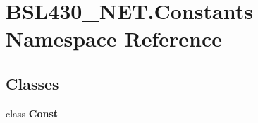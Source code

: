 \hypertarget{namespace_b_s_l430___n_e_t_1_1_constants}{}\section{B\+S\+L430\+\_\+\+N\+E\+T.\+Constants Namespace Reference}
\label{namespace_b_s_l430___n_e_t_1_1_constants}
\subsection*{Classes}
\begin{DoxyCompactItemize}
\item 
class {\bfseries Const}
\end{DoxyCompactItemize}
